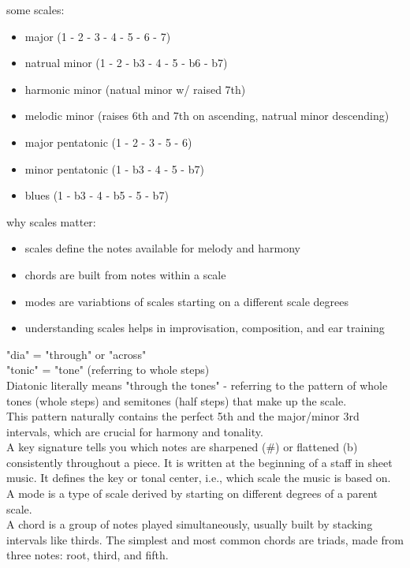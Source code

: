 \documentclass{article}
\begin{document}
some scales:
	\begin{itemize}
		\item major (1 - 2 - 3 - 4 - 5 - 6 - 7)
		\item natrual minor (1 - 2 - b3 - 4 - 5 - b6 - b7)
		\item harmonic minor (natual minor w/ raised 7th)
		\item melodic minor (raises 6th and 7th on ascending, natrual minor descending)
		\item major pentatonic (1 - 2 - 3 - 5 - 6)
		\item minor pentatonic (1 - b3 - 4 - 5 - b7)
		\item blues (1 - b3 - 4 - b5 - 5 - b7)
	\end{itemize}

why scales matter:
	\begin{itemize}
		\item scales define the notes available for melody and harmony
		\item chords are built from notes within a scale
		\item modes are variabtions of scales starting on a different scale degrees
		\item understanding scales helps in improvisation, composition, and ear training
	\end{itemize}

"dia" = "through" or "across"\\
"tonic" = "tone" (referring to whole steps)\\

Diatonic literally means "through the tones" - referring to the pattern of whole tones (whole steps) and semitones (half steps) that make up the scale.\\

This pattern naturally contains the perfect 5th and the major/minor 3rd intervals, which are crucial for harmony and tonality.\\

A key signature tells you which notes are sharpened (\#) or flattened (b) consistently throughout a piece. It is written at the beginning of a staff in sheet music. It defines the key or tonal center, i.e., which scale the music is based on.\\

A mode is a type of scale derived by starting on different degrees of a parent scale.\\

A chord is a group of notes played simultaneously, usually built by stacking intervals like thirds. The simplest and most common chords are triads, made from three notes: root, third, and fifth.
\end{document}
